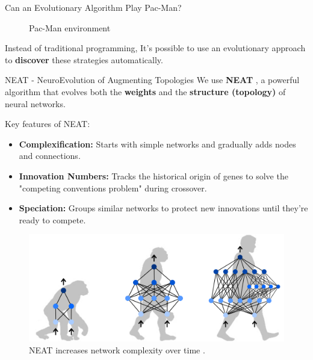 \begin{frame}{Can an Evolutionary Algorithm Play Pac-Man?}
\begin{minipage}{0.45\textwidth}
\begin{figure}
			\caption{\centering \small Pac-Man environment}
		\end{figure}

		\vspace{-1em}
	\end{minipage}

	Instead of traditional programming, It's possible to use an evolutionary approach to \textbf{discover} these strategies automatically.
\end{frame}

\begin{frame}{NEAT - NeuroEvolution of Augmenting Topologies}
		We use \textbf{NEAT} \cite{stanley2002evolving}, a powerful algorithm that evolves both the \textbf{weights} and the \textbf{structure (topology)} of neural networks.

		Key features of NEAT:
		\begin{itemize}
			\item \textbf{Complexification:} Starts with simple networks and gradually adds nodes and connections.
			\item \textbf{Innovation Numbers:} Tracks the historical origin of genes to solve the "competing conventions problem" during crossover.
			\item \textbf{Speciation:} Groups similar networks to protect new innovations until they're ready to compete.
		\end{itemize}

		\vspace{-0.5em}
		
		\begin{figure}
			\centering
			\includegraphics[width=0.55\linewidth]{assets/neat-evolution.png}
			\caption{NEAT increases network complexity over time \cite{shrestha2025reinforced}.}
		\end{figure}

\end{frame}



